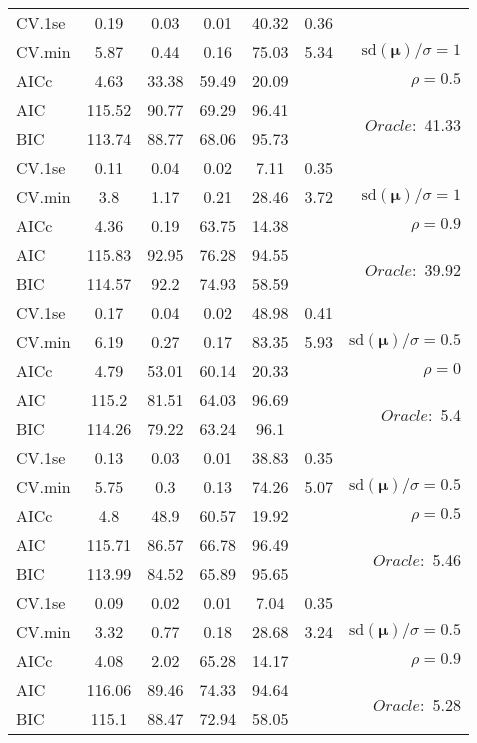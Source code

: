 \begin{table}
\begin{center}
\begin{tabular}{l*{5}{c}|r}
 \hline 
CV.1se & 0.19 & 0.03 & 0.01 & 40.32 & 0.36 & \\
CV.min & 5.87 & 0.44 & 0.16 & 75.03 & 5.34 &  $\mathrm{sd}(\mathbf{\mu})/\sigma=1$ \\
AICc & 4.63 & 33.38 & 59.49 & 20.09 & & $\rho=0.5$ \\
AIC & 115.52 & 90.77 & 69.29 & 96.41 & &  \multirow{2}{*}{$Oracle: $ 41.33} \\
BIC & 113.74 & 88.77 & 68.06 & 95.73 & &  \\
 \hline 
CV.1se & 0.11 & 0.04 & 0.02 & 7.11 & 0.35 & \\
CV.min & 3.8 & 1.17 & 0.21 & 28.46 & 3.72 &  $\mathrm{sd}(\mathbf{\mu})/\sigma=1$ \\
AICc & 4.36 & 0.19 & 63.75 & 14.38 & & $\rho=0.9$ \\
AIC & 115.83 & 92.95 & 76.28 & 94.55 & &  \multirow{2}{*}{$Oracle: $ 39.92} \\
BIC & 114.57 & 92.2 & 74.93 & 58.59 & &  \\
 \hline 
CV.1se & 0.17 & 0.04 & 0.02 & 48.98 & 0.41 & \\
CV.min & 6.19 & 0.27 & 0.17 & 83.35 & 5.93 &  $\mathrm{sd}(\mathbf{\mu})/\sigma=0.5$ \\
AICc & 4.79 & 53.01 & 60.14 & 20.33 & & $\rho=0$ \\
AIC & 115.2 & 81.51 & 64.03 & 96.69 & &  \multirow{2}{*}{$Oracle: $ 5.4} \\
BIC & 114.26 & 79.22 & 63.24 & 96.1 & &  \\
 \hline 
CV.1se & 0.13 & 0.03 & 0.01 & 38.83 & 0.35 & \\
CV.min & 5.75 & 0.3 & 0.13 & 74.26 & 5.07 &  $\mathrm{sd}(\mathbf{\mu})/\sigma=0.5$ \\
AICc & 4.8 & 48.9 & 60.57 & 19.92 & & $\rho=0.5$ \\
AIC & 115.71 & 86.57 & 66.78 & 96.49 & &  \multirow{2}{*}{$Oracle: $ 5.46} \\
BIC & 113.99 & 84.52 & 65.89 & 95.65 & &  \\
 \hline 
CV.1se & 0.09 & 0.02 & 0.01 & 7.04 & 0.35 & \\
CV.min & 3.32 & 0.77 & 0.18 & 28.68 & 3.24 &  $\mathrm{sd}(\mathbf{\mu})/\sigma=0.5$ \\
AICc & 4.08 & 2.02 & 65.28 & 14.17 & & $\rho=0.9$ \\
AIC & 116.06 & 89.46 & 74.33 & 94.64 & &  \multirow{2}{*}{$Oracle: $ 5.28} \\
BIC & 115.1 & 88.47 & 72.94 & 58.05 & &  \\
 \hline 
\end{tabular}
\end{center}
\vspace{-1cm}
\end{table}





